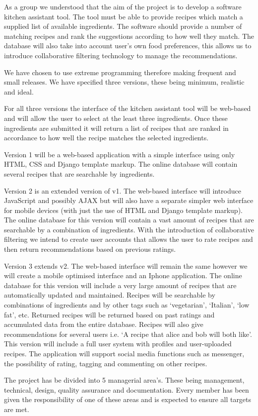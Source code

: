 As a group we understood that the aim of the project is to develop a software kitchen assistant tool. The tool must be able to provide recipes which match a supplied list of available ingredients. The software should provide a number of matching recipes and rank the suggestions according to how well they match. The database will also take into account user’s own food preferences, this allows us to introduce collaborative filtering technology to manage the recommendations. 

We have chosen to use extreme programming therefore making frequent and small releases. We have specified three versions, these being minimum, realistic and ideal. 

For all three versions the interface of the kitchen assistant tool will be web-based and will allow the user to select at the least three ingredients. Once these ingredients are submitted it will return a list of recipes that are ranked in accordance to how well the recipe matches the selected ingredients. 

Version 1 will be a web-based application with a simple interface using only HTML, CSS and Django template markup. The online database will contain several recipes that are searchable by ingredients.

Version 2 is an extended version of v1.  The web-based interface will introduce JavaScript and possibly AJAX but will also have a separate simpler web interface for mobile devices (with just the use of HTML and Django template markup). The online database for this version will contain a vast amount of recipes that are searchable by a combination of ingredients. With the introduction of collaborative filtering we intend to create user accounts that allows the user to rate recipes and then return recommendations based on previous ratings. 

Version 3 extends v2. The web-based interface will remain the same however we will create a mobile optimised interface and an Iphone application. The online database for this version will include a very large amount of recipes that are automatically updated and maintained. Recipes will be searchable by combinations of ingredients and by other tags such as ‘vegetarian’, ‘Italian’, ‘low fat’, etc. Returned recipes will be returned based on past ratings and accumulated data from the entire database. Recipes will also give recommendations for several users i.e. ‘A recipe that alice and bob will both like’. This version will include a full user system with profiles and user-uploaded recipes. The application will support social media functions such as messenger, the possibility of rating, tagging and commenting on other recipes. 

The project has be divided into 5 managerial area’s. These being management, technical, design, quality assurance and documentation. Every member has been given the responsibility of one of these areas and is expected to ensure all targets are met.


